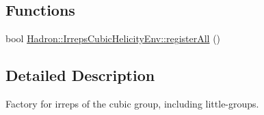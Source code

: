 \subsection*{Functions}
\begin{DoxyCompactItemize}
\item 
bool \mbox{\hyperlink{namespaceHadron_1_1IrrepsCubicHelicityEnv_a3c43156ee3e7bda6a9a9536083bfdeff}{Hadron\+::\+Irreps\+Cubic\+Helicity\+Env\+::register\+All}} ()
\end{DoxyCompactItemize}


\subsection{Detailed Description}
Factory for irreps of the cubic group, including little-\/groups. 

